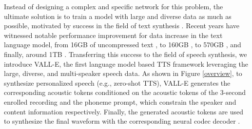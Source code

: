 \documentclass{article}
\theoremstyle{plain}
\theoremstyle{definition}
\theoremstyle{remark}
\newcommand\our{\textsc{VALL-E}}
\begin{document}
Instead of designing a complex and specific network for this problem, the ultimate solution is to train a model with large and diverse data as much as possible, motivated by success in the field of text synthesis \citep{DBLP:conf/nips/BrownMRSKDNSSAA20,DBLP:journals/corr/abs-2204-02311}.  
Recent years have witnessed  notable performance improvement for data increase in the text language model, from 16GB of uncompressed text \citep{devlin2019bert}, to 160GB \citep{liu2019roberta}, to 570GB \citep{DBLP:conf/nips/BrownMRSKDNSSAA20}, and finally, around 1TB \citep{DBLP:journals/corr/abs-2204-02311}. 
Transferring this success to the field of speech synthesis, %
we introduce \our{}, the first language model based TTS framework leveraging the large, diverse, and multi-speaker speech data. 
As shown in Figure \ref{overview}, to synthesize personalized speech (e.g., zero-shot TTS), \our{} generates the corresponding acoustic tokens conditioned on the acoustic tokens of the 3-second enrolled recording and the phoneme prompt, which  constrain the speaker and content information respectively.  %
Finally, the generated acoustic tokens are used to synthesize the final waveform with the corresponding neural codec decoder  \citep{defossez2022high}.  
\end{document}
